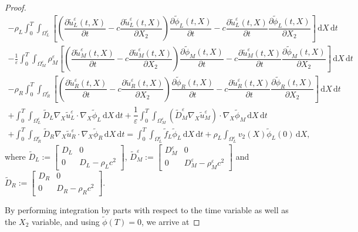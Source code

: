 \documentclass[11pt]{article}
\def\es{\varepsilon}
\def\orr{\Omega_R^\varepsilon}
\def\omm{\Omega_M^\varepsilon}
\def\oll{\Omega_L^\varepsilon}
\newcommand{\di}[1]{\,\mathrm{d}#1}
\begin{document}
\begin{proof}
\begin{multline*}
    -\rho_L\int_0^T\int_{\oll}\left[ \left(\dfrac{\partial \widetilde{u}_{L}^\es(t,X)}{\partial t}-c\dfrac{\partial \widetilde{u}_{L}^\es(t,X)}{\partial{X_2}}\right)\dfrac{\partial \widetilde{\phi}_{L}(t,X)}{\partial t}-c\dfrac{\partial \widetilde{u}_{L}^\es(t,X)}{\partial{t}}\dfrac{\partial \widetilde{\phi}_{L}(t,X)}{\partial X_2}\right]\di{X}\di{t}\\
     -\frac{1}{\es}\int_0^T\int_{\omm} \rho_M^\es\left[ \left(\dfrac{\partial \widetilde{u}_{M}^\es(t,X)}{\partial t}-c\dfrac{\partial \widetilde{u}_{M}^\es(t,X)}{\partial{X_2}}\right)\dfrac{\partial \widetilde{\phi}_{M}(t,X)}{\partial t}-c\dfrac{\partial \widetilde{u}_{M}^\es(t,X)}{\partial{t}}\dfrac{\partial \widetilde{\phi}_{M}(t,X)}{\partial X_2}\right]\di{X}\di{t}\\
      -\rho_R\int_0^T\int_{\orr} \left[\left(\dfrac{\partial \widetilde{u}_{R}^\es(t,X)}{\partial t}-c\dfrac{\partial \widetilde{u}_{R}^\es(t,X)}{\partial{X_2}}\right)\dfrac{\partial \widetilde{\phi}_{R}(t,X)}{\partial t}-c\dfrac{\partial \widetilde{u}_{R}^\es(t,X)}{\partial{t}}\dfrac{\partial \widetilde{\phi}_{R}(t,X)}{\partial X_2}\right]\di{X\di{t}}\\
       +\int_0^T\int_{\oll}\widetilde{D}_L\nabla_X \widetilde{u}_L^\es\cdot\nabla_X  \widetilde{\phi}_L \di{X}\di{t}+\dfrac{1}{\es}\int_0^T\int_{\omm}\left(\widetilde{D}_M^\es\nabla_X \widetilde{u}_M^\es\right)\cdot\nabla_X  \widetilde{\phi}_M\di{X}\di{t}\\
        +\int_0^T\int_{\orr} \widetilde{D}_R\nabla_X \widetilde{u}_R^\es\cdot\nabla_X  \widetilde{\phi}_R \di{X}\di{t}=\int_0^T\int_{\oll}\widetilde{f}_L \widetilde{\phi}_L\di{X}\di{t}+\rho_L\int_{\oll}v_2(X) \widetilde{\phi}_L(0)\di{X},
\end{multline*}
where $\widetilde{D}_L:=\begin{bmatrix}
D_L & 0 \\
0 & D_L-\rho_Lc^2
\end{bmatrix}$, $\widetilde{D}_M^\es:=\begin{bmatrix}
D_M^\es & 0 \\
0 & D_M^\es-\rho_M^\es c^2
\end{bmatrix}$ and $\widetilde{D}_R:=\begin{bmatrix}
D_R & 0 \\
0 & D_R-\rho_Rc^2
\end{bmatrix}$. 

By performing integration by parts with respect to the time variable as well as the $X_2$ variable, and using $\widetilde{\phi}(T)=0$, we arrive at


\end{proof}
\end{document}
